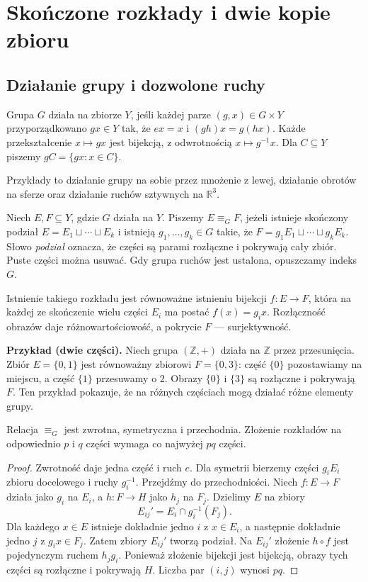 \section{Skończone rozkłady i dwie kopie zbioru}
\subsection{Działanie grupy i dozwolone ruchy}
\begin{definicja}
Grupa $G$ działa na zbiorze $Y$, jeśli każdej parze $(g,x)\in G\times Y$ przyporządkowano $gx\in Y$ tak, że $ex=x$ i $(gh)x=g(hx)$. Każde przekształcenie $x\mapsto gx$ jest bijekcją, z odwrotnością $x\mapsto g^{-1}x$. Dla $C\subseteq Y$ piszemy $gC=\{gx:x\in C\}$.
\end{definicja}
Przykłady to działanie grupy na sobie przez mnożenie z lewej, działanie obrotów na sferze oraz działanie ruchów sztywnych na $\mathbb R^3$.
\begin{definicja}\label{def:rownorozklad}
Niech $E,F\subseteq Y$, gdzie $G$ działa na $Y$. Piszemy $E\mathrel{\equiv_G} F$, jeżeli istnieje skończony podział $E=E_1\sqcup\cdots\sqcup E_k$ i istnieją $g_1,\ldots,g_k\in G$ takie, że $F=g_1E_1\sqcup\cdots\sqcup g_kE_k$. Słowo \emph{podział} oznacza, że części są parami rozłączne i pokrywają cały zbiór. Puste części można usuwać. Gdy grupa ruchów jest ustalona, opuszczamy indeks $G$.
\end{definicja}
Istnienie takiego rozkładu jest równoważne istnieniu bijekcji $f:E\to F$, która na każdej ze skończenie wielu części $E_i$ ma postać $f(x)=g_ix$. Rozłączność obrazów daje różnowartościowość, a pokrycie $F$ --- surjektywność.

\textbf{Przykład (dwie części).} Niech grupa $(\mathbb Z,+)$ działa na $\mathbb Z$ przez przesunięcia. Zbiór $E=\{0,1\}$ jest równoważny zbiorowi $F=\{0,3\}$: część $\{0\}$ pozostawiamy na miejscu, a część $\{1\}$ przesuwamy o $2$. Obrazy $\{0\}$ i $\{3\}$ są rozłączne i pokrywają $F$. Ten przykład pokazuje, że na różnych częściach mogą działać różne elementy grupy.

\begin{lemat}\label{lem:skladanie}
Relacja $\mathrel{\equiv_G}$ jest zwrotna, symetryczna i przechodnia. Złożenie rozkładów na odpowiednio $p$ i $q$ części wymaga co najwyżej $pq$ części.
\end{lemat}
\begin{proof}
Zwrotność daje jedna część i ruch $e$. Dla symetrii bierzemy części $g_iE_i$ zbioru docelowego i ruchy $g_i^{-1}$. Przejdźmy do przechodniości. Niech $f:E\to F$ działa jako $g_i$ na $E_i$, a $h:F\to H$ jako $h_j$ na $F_j$. Dzielimy $E$ na zbiory
\begin{equation}\label{eq:3-1}
 E_{ij}'=E_i\cap g_i^{-1}(F_j).
\end{equation}
Dla każdego $x\in E$ istnieje dokładnie jedno $i$ z $x\in E_i$, a następnie dokładnie jedno $j$ z $g_ix\in F_j$. Zatem zbiory $E_{ij}'$ tworzą podział. Na $E_{ij}'$ złożenie $h\circ f$ jest pojedynczym ruchem $h_jg_i$. Ponieważ złożenie bijekcji jest bijekcją, obrazy tych części są rozłączne i pokrywają $H$. Liczba par $(i,j)$ wynosi $pq$.
\end{proof}

